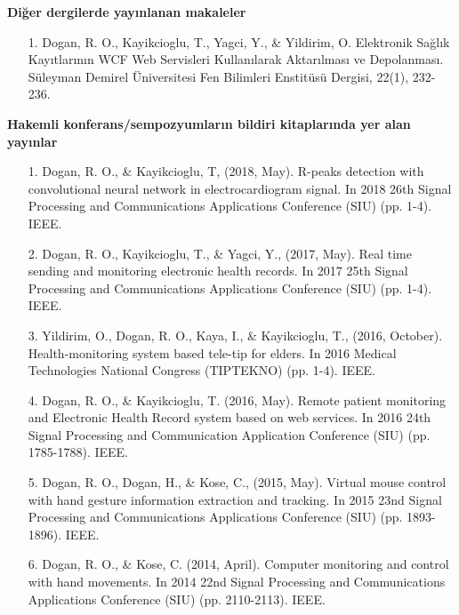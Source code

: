 \indent \textbf{Diğer dergilerde yayınlanan makaleler}

\begin{enumerate}
\item[1.] Dogan, R. O., Kayikcioglu, T., Yagci, Y., \& Yildirim, O. Elektronik Sağlık Kayıtlarının WCF Web Servisleri Kullanılarak Aktarılması ve Depolanması. Süleyman Demirel Üniversitesi Fen Bilimleri Enstitüsü Dergisi, 22(1), 232-236.
\end{enumerate}


\indent \textbf{Hakemli konferans/sempozyumların bildiri kitaplarında yer alan yayınlar}

\begin{enumerate}
\item[1.] Dogan, R. O., \& Kayikcioglu, T, (2018, May). R-peaks detection with convolutional neural network in electrocardiogram signal. In 2018 26th Signal Processing and Communications Applications Conference (SIU) (pp. 1-4). IEEE.
\item[2.] Dogan, R. O., Kayikcioglu, T., \& Yagci, Y., (2017, May). Real time sending and monitoring electronic health records. In 2017 25th Signal Processing and Communications Applications Conference (SIU) (pp. 1-4). IEEE.
\item[3.] Yildirim, O., Dogan, R. O., Kaya, I., \& Kayikcioglu, T., (2016, October). Health-monitoring system based tele-tip for elders. In 2016 Medical Technologies National Congress (TIPTEKNO) (pp. 1-4). IEEE.
\item[4.] Dogan, R. O., \& Kayikcioglu, T. (2016, May). Remote patient monitoring and Electronic Health Record system based on web services. In 2016 24th Signal Processing and Communication Application Conference (SIU) (pp. 1785-1788). IEEE.
\item[5.] Dogan, R. O., Dogan, H., \& Kose, C., (2015, May). Virtual mouse control with hand gesture information extraction and tracking. In 2015 23nd Signal Processing and Communications Applications Conference (SIU) (pp. 1893-1896). IEEE.
\item[6.] Dogan, R. O., \& Kose, C. (2014, April). Computer monitoring and control with hand movements. In 2014 22nd Signal Processing and Communications Applications Conference (SIU) (pp. 2110-2113). IEEE.
\end{enumerate}
\thispagestyle{empty}



  






